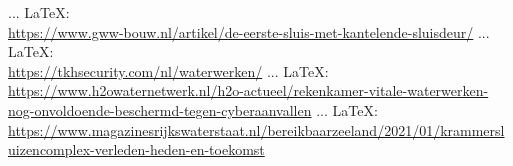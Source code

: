 \begin{thebibliography}{99}
{{{{				 ... \LaTeX:\\ \url{https://www.gww-bouw.nl/artikel/de-eerste-sluis-met-kantelende-sluisdeur/}
				 ... \LaTeX:\\ \url{https://tkhsecurity.com/nl/waterwerken/}
				 ... \LaTeX:\\ \url{https://www.h2owaternetwerk.nl/h2o-actueel/rekenkamer-vitale-waterwerken-nog-onvoldoende-beschermd-tegen-cyberaanvallen}
				 ... \LaTeX:\\ \url{https://www.magazinesrijkswaterstaat.nl/bereikbaarzeeland/2021/01/krammersluizencomplex-verleden-heden-en-toekomst}
				
				
				
				
				
				
}}}}
\end{thebibliography}
